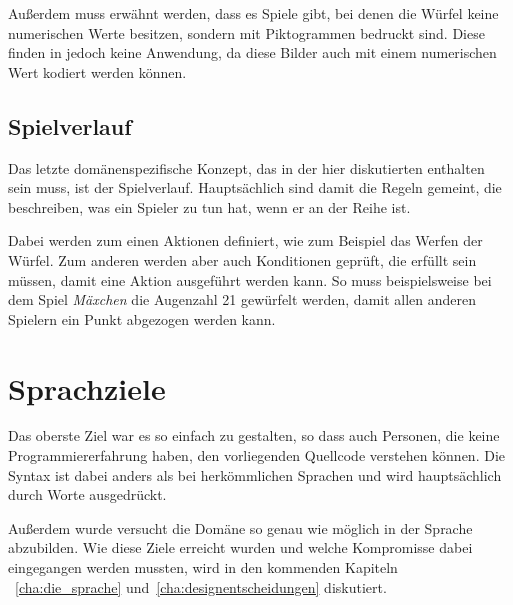 		Außerdem muss erwähnt werden, dass es Spiele gibt, bei denen die Würfel keine numerischen Werte besitzen, sondern mit Piktogrammen bedruckt sind. Diese finden in \dg jedoch keine Anwendung, da diese Bilder auch mit einem numerischen Wert kodiert werden können.

	\subsection{Spielverlauf}
	\label{sub:spielverlauf}
		Das letzte domänenspezifische Konzept, das in der hier diskutierten enthalten sein muss, ist der Spielverlauf. Hauptsächlich sind damit die Regeln gemeint, die beschreiben, was ein Spieler zu tun hat, wenn er an der Reihe ist.

		Dabei werden zum einen Aktionen definiert, wie zum Beispiel das Werfen der Würfel. Zum anderen werden aber auch Konditionen geprüft, die erfüllt sein müssen, damit eine Aktion ausgeführt werden kann. So muss beispielsweise bei dem Spiel \emph{Mäxchen} die Augenzahl 21 gewürfelt werden, damit allen anderen Spielern ein Punkt abgezogen werden kann.

\section{Sprachziele}
\label{sec:sprachziele}
	Das oberste Ziel war es \dg so einfach zu gestalten, so dass auch Personen, die keine Programmiererfahrung haben, den vorliegenden Quellcode verstehen können. Die Syntax ist dabei anders als bei herkömmlichen Sprachen und wird hauptsächlich durch Worte ausgedrückt.

	Außerdem wurde versucht die Domäne so genau wie möglich in der Sprache abzubilden. Wie diese Ziele erreicht wurden und welche Kompromisse dabei eingegangen werden mussten, wird in den kommenden Kapiteln ~\ref{cha:die_sprache} und~\ref{cha:designentscheidungen} diskutiert.